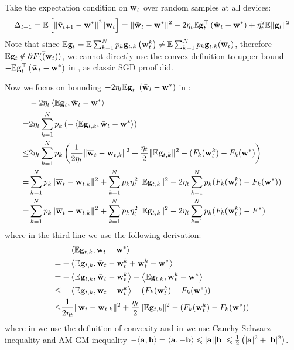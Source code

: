 Take the expectation condition on ${\mathbf{w}}_t$ over random samples at all devices:
\begin{align}
\Delta_{t+1} = \mathbb{E}\left[\left\|\bar{{\mathbf{v}}}_{t+1}-{\mathbf{w}}^{*}\right\|^2| {\mathbf{w}}_{t}\right]=\|\bar{{\mathbf{w}}}_{t}-{\mathbf{w}}^{*}\|^{2}-2 \eta_{t} \mathbb{E} {\mathbf{g}}_{t}^{\top}\left(\bar{{\mathbf{w}}}_{t}-{\mathbf{w}}^{*}\right)+\eta_{t}^{2} \mathbb{E}\| {\mathbf{g}}_{t} \|^{2}	
\label{eq:expand}
\end{align}
Note that since $\mathbb{E} {\mathbf{g}}_t = \mathbb{E} \sum_{k=1}^{N} p_{k} {\mathbf{g}}_{t, k}\left({\mathbf{w}}_{t}^{k}\right) \neq \mathbb{E} \sum_{k=1}^Np_k {\mathbf{g}}_{t,k}(\overline{{\mathbf{w}}}_t)$, therefore $\mathbb{E} {\mathbf{g}}_t \notin \partial F(\overline({\mathbf{w}}_t))$, we cannot directly use the convex definition to
upper bound $- \mathbb{E} {\mathbf{g}}_{t}^{\top}\left(\bar{{\mathbf{w}}}_{t}-{\mathbf{w}}^{*}\right)$ in \eq{\ref{eq:expand}}, as classic SGD proof did. 

Now we focus on bounding $-2 \eta_{t} \mathbb{E} {\mathbf{g}}_{t}^{\top}\left(\bar{{\mathbf{w}}}_{t}-{\mathbf{w}}^{*}\right)$ in \eq{\ref{eq:expand}}: 
\begin{align}
	& -2 \eta_{t} \left<\mathbb{E} {\mathbf{g}}_{t}, \bar{{\mathbf{w}}}_{t}-{\mathbf{w}}^{*} \right>\\
  = & 2 \eta_{t} \sum_{k=1}^N p_k \left(-\left<\mathbb{E} {\mathbf{g}}_{t,k}, \bar{{\mathbf{w}}}_{t}-{\mathbf{w}}^{*} \right> \right) \\
  \leq& 2 \eta_{t} \sum_{k=1}^N p_k  \left(\frac{1}{2\eta_t} \|\overline{{\mathbf{w}}}_t - {\mathbf{w}}_{t,k}\|^2 + \frac{\eta_t}{2} \|\mathbb{E} {\mathbf{g}}_{t,k}\|^2 - (F_k({\mathbf{w}}_t^k) - F_k({\mathbf{w}}^*) \right) \\
  =& \sum_{k=1}^N p_k \|\overline{{\mathbf{w}}}_t - {\mathbf{w}}_{t,k}\|^2 +  \sum_{k=1}^N p_k \eta_t^2 \|\mathbb{E} {\mathbf{g}}_{t,k}\|^2 
  - 2\eta_t\sum_{k=1}^N p_k (F_k({\mathbf{w}}_t^k) - F_k({\mathbf{w}}^*)) \\
  =& \sum_{k=1}^N p_k \|\overline{{\mathbf{w}}}_t - {\mathbf{w}}_{t,k}\|^2 +  \sum_{k=1}^N p_k \eta_t^2 \|\mathbb{E} {\mathbf{g}}_{t,k}\|^2 
  - 2\eta_t\sum_{k=1}^N p_k (F_k({\mathbf{w}}_t^k) - F^*) \label{eq:exp4}
\end{align}
where in the third line we use the following derivation:
\begin{align}
	& -\left<\mathbb{E} {\mathbf{g}}_{t,k}, \bar{{\mathbf{w}}}_{t} - {\mathbf{w}}^{*} \right>\\
=& - \left<\mathbb{E} {\mathbf{g}}_{t,k}, \bar{{\mathbf{w}}}_{t} - {\mathbf{w}}_t^k +  {\mathbf{w}}_t^k - {\mathbf{w}}^{*} \right>\\
=& - \left<\mathbb{E} {\mathbf{g}}_{t,k}, \bar{{\mathbf{w}}}_{t} - {\mathbf{w}}_t^k\right> - \left<\mathbb{E} {\mathbf{g}}_{t,k}, {\mathbf{w}}_t^k - {\mathbf{w}}^{*} \right>\\
\leq & - \left<\mathbb{E} {\mathbf{g}}_{t,k}, \bar{{\mathbf{w}}}_{t} - {\mathbf{w}}_t^k\right> - (F_k({\mathbf{w}}_t^k) - F_k({\mathbf{w}}^*)) \label{eq:3}\\
\leq & \frac{1}{2\eta_t} \|{\mathbf{w}}_t - {\mathbf{w}}_{t,k}\|^2 + \frac{\eta_t}{2} \|\mathbb{E} {\mathbf{g}}_{t,k}\|^2
- (F_k({\mathbf{w}}_t^k) - F_k({\mathbf{w}}^*)) \label{eq:4}
\end{align}
where in \eq{\ref{eq:3}} we use the definition of convexity and in \eq{\ref{eq:4}} we use Cauchy-Schwarz inequality and AM-GM inequality $-\langle{\mathbf{a}}, {\mathbf{b}}\rangle=\langle{\mathbf{a}},-{\mathbf{b}}\rangle \leqslant|{\mathbf{a}}||{\mathbf{b}}| \leqslant \frac{1}{2}\left(|{\mathbf{a}}|^{2}+|{\mathbf{b}}|^{2}\right)$.



